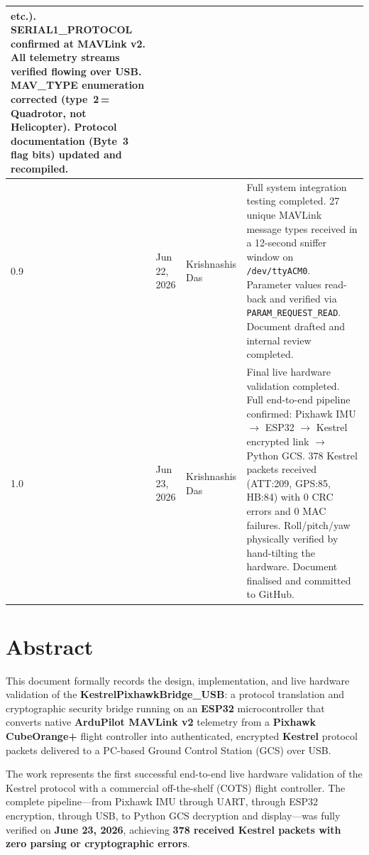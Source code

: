 \documentclass[11pt,a4paper]{article}
\begin{document}
\begin{longtable}{@{}p{1.0cm}p{2.6cm}p{3.0cm}p{7.2cm}@{}}
        etc.). SERIAL1\_PROTOCOL confirmed at MAVLink v2. All telemetry
        streams verified flowing over USB. MAV\_TYPE enumeration corrected
        (type~2\,=\,Quadrotor, not Helicopter). Protocol documentation
        (Byte~3 flag bits) updated and recompiled. \\
    \midrule
    0.9 & Jun 22, 2026 & Krishnashis Das &
        Full system integration testing completed. 27 unique MAVLink message
        types received in a 12-second sniffer window on \texttt{/dev/ttyACM0}.
        Parameter values read-back and verified via \texttt{PARAM\_REQUEST\_READ}.
        Document drafted and internal review completed. \\
    \midrule
    1.0 & Jun 23, 2026 & Krishnashis Das &
        Final live hardware validation completed. Full end-to-end pipeline
        confirmed: Pixhawk IMU $\rightarrow$ ESP32 $\rightarrow$ Kestrel
        encrypted link $\rightarrow$ Python GCS. 378 Kestrel packets
        received (ATT:209, GPS:85, HB:84) with 0 CRC errors and 0 MAC
        failures. Roll/pitch/yaw physically verified by hand-tilting the
        hardware. Document finalised and committed to GitHub. \\
\end{longtable}

\newpage
\tableofcontents
\newpage

\section*{Abstract}

This document formally records the design, implementation, and live hardware
validation of the \textbf{KestrelPixhawkBridge\_USB}: a protocol translation
and cryptographic security bridge running on an \textbf{ESP32} microcontroller
that converts native \textbf{ArduPilot MAVLink v2} telemetry from a
\textbf{Pixhawk CubeOrange+} flight controller into authenticated, encrypted
\textbf{Kestrel} protocol packets delivered to a PC-based Ground Control Station
(GCS) over USB.

\vspace{0.5cm}

The work represents the first successful end-to-end live hardware validation of
the Kestrel protocol with a commercial off-the-shelf (COTS) flight controller.
The complete pipeline---from Pixhawk IMU through UART, through ESP32 encryption,
through USB, to Python GCS decryption and display---was fully verified on
\textbf{June 23, 2026}, achieving \textbf{378 received Kestrel packets with
zero parsing or cryptographic errors}.
\end{document}
